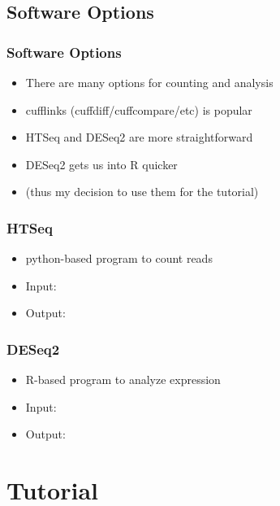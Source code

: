 \documentclass[14pt,handout]{beamer}
\begin{document}
\subsection{Software Options}

\begin{frame}
\frametitle{Software Options}
\begin{itemize}
	\item<+-> There are many options for counting and analysis
	\item<+-> cufflinks (cuffdiff/cuffcompare/etc) is popular
	\item<+-> HTSeq and DESeq2 are more straightforward
	\item<+-> DESeq2 gets us into R quicker
	\item<+-> (thus my decision to use them for the tutorial)
\end{itemize}
\end{frame}

\begin{frame}
\frametitle{HTSeq}
\begin{itemize}
	\item<+-> python-based program to count reads
	\item<+-> Input: 
	\item<+-> Output:
\end{itemize}
\end{frame}

\begin{frame}
\frametitle{DESeq2}
\begin{itemize}
	\item<+-> R-based program to analyze expression
	\item<+-> Input: 
	\item<+-> Output: 
\end{itemize}
\end{frame}

\section{Tutorial}
\end{document}
